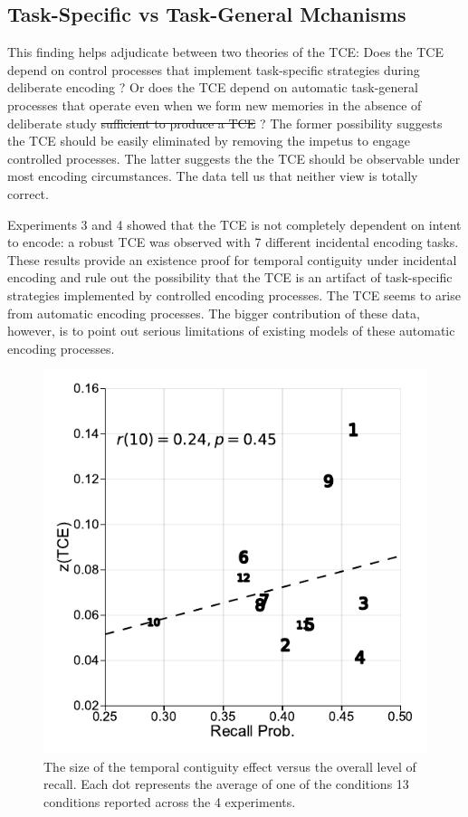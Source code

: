 \documentclass[man,natbib,floatsintext]{apa6} %
\begin{document}
\subsection{Task-Specific vs Task-General Mchanisms}
This finding helps adjudicate between two theories of the TCE: Does the TCE \color{black} depend on control processes that implement task-specific strategies during deliberate encoding \citep{Hint16}? Or does the TCE depend on automatic task-general processes that operate even when we form new memories in the absence of deliberate study \st{sufficient to produce a TCE} \citep{HealKaha17}? The former possibility suggests the TCE should be easily eliminated by removing the impetus to engage controlled processes. The latter suggests the the TCE should be observable under most encoding circumstances. The data tell us that neither view is totally correct.

Experiments 3 and 4 showed that the TCE is not completely dependent on intent to encode: a robust TCE was observed with 7 different incidental encoding tasks. These results provide an existence proof for temporal contiguity under incidental encoding and rule out the possibility that the TCE is an artifact of task-specific strategies implemented by controlled encoding processes. The TCE seems to arise from automatic encoding processes. The bigger contribution of these data, however, is to point out serious limitations of existing models of these automatic encoding processes. 


\begin{figure}%
\includegraphics{figures/correlation.pdf}
\caption{The size of the temporal contiguity effect versus the overall level of recall. Each dot represents the average of one of the conditions 13 conditions reported across the 4 experiments.}
\label{corr}
\end{figure}
\end{document}

